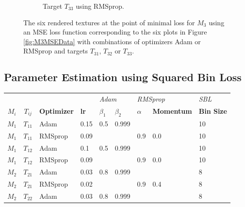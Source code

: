 \begin{figure}[h]
\begin{subfigure}[t]{.25\textwidth}
    \caption{Target $T_{33}$ using RMSprop.}
    \label{fig:M3MSEFinalRendersRealLifeRMSprop}
\end{subfigure}
\caption{The six rendered textures at the point of minimal loss for $M_3$ using an MSE loss function corresponding to the six plots in Figure \ref{fig:M3MSEData} with combinations of optimizers Adam or RMSprop and targets $T_{31}$, $T_{32}$ or $T_{33}$.}
\label{fig:M3MSEFinalRenders}
\end{figure}

\subsection{Parameter Estimation using Squared Bin Loss}

\begin{table}[h]
\centering
\begin{tabular}{cclllllll}
\textbf{}      &                   & \textbf{}          & \multicolumn{1}{l|}{}            & \multicolumn{2}{l|}{\textit{Adam}}                           & \multicolumn{2}{l|}{\textit{RMSprop}}                      & \multicolumn{1}{l|}{\textit{SBL}}      \\
\textbf{$M_i$} & \textbf{$T_{ij}$} & \textbf{Optimizer} & \multicolumn{1}{l|}{\textbf{lr}} & \textbf{$\beta_1$} & \multicolumn{1}{l|}{\textbf{$\beta_2$}} & \textbf{$\alpha$} & \multicolumn{1}{l|}{\textbf{Momentum}} & \multicolumn{1}{l|}{\textbf{Bin Size}} \\ \hline
 $M_1$      & $T_{11}$   & Adam       & 0.15       & 0.5        & 0.999      &            &            & 10        \\
 $M_1$      & $T_{11}$   & RMSprop    & 0.09       &            &            & 0.9        & 0.0        & 10        \\
 $M_1$      & $T_{12}$   & Adam       & 0.1        & 0.5        & 0.999      &            &            & 10        \\
 $M_1$      & $T_{12}$   & RMSprop    & 0.09       &            &            & 0.9        & 0.0        & 10        \\
 $M_2$     & $T_{21}$   & Adam       & 0.03       & 0.8        & 0.999      &            &            & 8          \\
 $M_2$     & $T_{21}$   & RMSprop    & 0.02       &            &            & 0.9        & 0.4        & 8          \\
 $M_2$     & $T_{22}$   & Adam       & 0.03       & 0.8        & 0.999      &            &            & 8          \\

\end{tabular}
\end{table}
